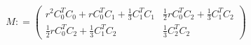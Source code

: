 \begin{equation}  
M: = 
    \left(
    \begin{matrix}
        r^2C_0^T C_0 + rC_0^T C_1 + \frac{1}{3} C_1^T C_1 &
        \frac{1}{2} r C_0^T C_2 + \frac{1}{3} C_1^TC_2 \\
        \frac{1}{2} r C_0^T C_2 + \frac{1}{3} C_1^TC_2   &
        \frac{1}{3} C_2^T C_2
    \end{matrix}
    \right)
\end{equation}
